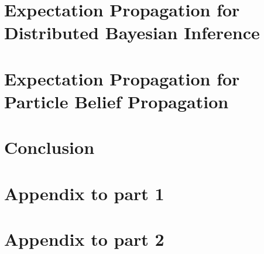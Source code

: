 \ifbgm\fi

\chapter[EP for Distributed Bayesian Inference]{Expectation Propagation for\\ Distributed Bayesian Inference}
\ifsnep\fi

\chapter[EPBP]{Expectation Propagation for\\ Particle Belief Propagation}

\ifpbp\fi


\chapter{Conclusion}




\begin{appendices}
\chapter{Appendix to part 1}


\chapter{Appendix to part 2}
\end{appendices}



\newpage
\renewcommand{\bibname}{References}

\singlespacing
\begin{footnotesize}

\end{footnotesize}


